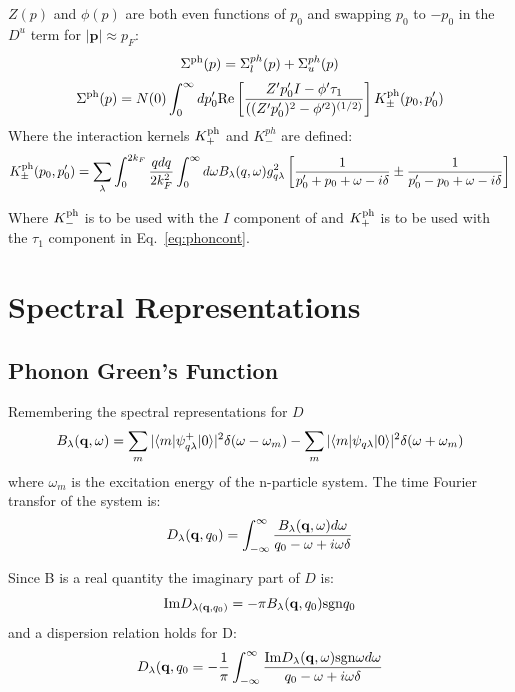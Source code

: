 \documentclass{article}
\def\q{{\bf q}}
\def\bra{\langle}
\def\ket{\rangle}
\begin{document}
$Z(p)$ and $\phi(p)$ are both even functions of $p_{0}$ and swapping $p_0$ to $-p_0$
in the $D^{u}$ term for $|\mathbf{p}|\approx p_{F}$: 
%
\begin{equation}
\Sigma^{\rm ph}(p) =  \Sigma_{l}^{ph}(p) + \Sigma_{u}^{ph}(p)
\end{equation}
%
\begin{equation}
\label{eq:phoncont}
\Sigma^{\rm ph}(p) =  N(0) \int_{0}^{\infty} dp'_{0}{\rm Re}\left[\frac{Z'p_{0}' I - \phi'\tau_{1}}{((Z'p'_{0})^{2}-\phi'^{2})^{(1/2)}}\right]
K_{\pm}^{\rm ph}(p_{0}, p_{0}') 
\end{equation}
% 
Where the interaction kernels $K_{+}^{\rm ph}$ and $K^{ph}_{-}$ are defined:
%
\begin{equation}
K_{\pm}^{\rm ph}(p_{0},p_{0}') = \sum_{\lambda} \int_{0}^{2k_{F}}\frac{qdq}{2k_{F}^{2}}
\int_{0}^{\infty}d\omega B_{\lambda}(q,\omega) g^{2}_{q\lambda} 
\left[ \frac{1}{p_{0}'+p_{0} + \omega - i\delta } \pm \frac{1}{p'_{0} -p_{0} + \omega - i\delta} \right]
\end{equation}

Where $K_{-}^{\rm ph}$ is to be used with the $I$ component of and $K_{+}^{\rm ph}$ is to be used with the $\tau_{1}$
component in Eq.~\ref{eq:phoncont}.

\section{Spectral Representations}
\subsection{Phonon Green's Function}
Remembering the spectral representations for $D$
%
\begin{equation}
B_{\lambda}(\q,\omega) = \sum_{m} |\bra m| \psi^{+}_{q\lambda}|0\ket|^{2}\delta(\omega-\omega_{m})
- \sum_{m}|\bra m | \psi_{q\lambda} | 0 \ket | ^{2} \delta(\omega+\omega_{m})
\end{equation}
% 
where $\omega_{m}$ is the excitation energy of the n-particle system.
The time Fourier transfor of the system is:
%
\begin{equation}
D_{\lambda} (\q, q_{0}) = \int_{-\infty}^{\infty} \frac{B_{\lambda}(\q,\omega) d\omega}{q_{0}-\omega + i\omega\delta}
\end{equation}
%

Since B is a real quantity the imaginary part of $D$ is:
%
\begin{equation}
{\rm Im} D_{\lambda(\q,q_{0})} = - \pi B_{\lambda}(\q,q_{0}){\rm sgn} q_{0}
\end{equation}
%
and a dispersion relation holds for D:
%
\begin{equation}
D_{\lambda}(\q,q_{0} = -\frac{1}{\pi} \int_{-\infty}^{\infty} \frac{{\rm Im} D_{\lambda}(\q,\omega) {\rm sgn \omega} d\omega}{q_{0} - \omega + i\omega\delta}
\end{equation}
\end{document}
